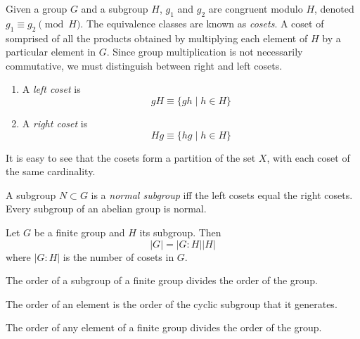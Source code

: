 \documentclass{article}
\begin{document}
    \begin{definition}
      Given a group $G$ and a subgroup $H$, $g_1$ and $g_2$ are congruent modulo $H$, denoted $g_1 \equiv g_2 \pmod{H}$. The equivalence classes are known as \textit{cosets}. A coset of somprised of all the products obtained by multiplying each element of $H$ by a particular element in $G$. Since group multiplication is not necessarily commutative, we must distinguish between right and left cosets. 
      \begin{enumerate}
        \item A \textit{left coset} is 
          \begin{equation}
            g H \equiv \{g h \;| \;h \in H \} 
          \end{equation}
        \item A \textit{right coset} is 
          \begin{equation}
            H g \equiv \{h g \;|\; h \in H \}
          \end{equation}
      \end{enumerate}
      It is easy to see that the cosets form a partition of the set $X$, with each coset of the same cardinality. 
    \end{definition}

    \begin{definition}
      A subgroup $N \subset G$ is a \textit{normal subgroup} iff the left cosets equal the right cosets. Every subgroup of an abelian group is normal. 
    \end{definition}

    \begin{theorem}
      Let $G$ be a finite group and $H$ its subgroup. Then 
      \begin{equation}
        |G| = |G:H| |H|
      \end{equation}
      where $|G:H|$ is the number of cosets in $G$. 
    \end{theorem}

    \begin{corollary}
      The order of a subgroup of a finite group divides the order of the group. 
    \end{corollary}

    \begin{definition}
      The order of an element is the order of the cyclic subgroup that it generates. 
    \end{definition}

    \begin{corollary}
      The order of any element of a finite group divides the order of the group. 
    \end{corollary}
\end{document}
